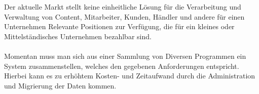 Der aktuelle Markt stellt keine einheitliche Lösung für die Verarbeitung und Verwaltung von Content, Mitarbeiter, Kunden, Händler und andere für einen Unternehmen Relevante Positionen zur Verfügung, die für ein kleines oder Mittelständisches Unternehmen bezahlbar sind.
\\
\\
Momentan muss man sich aus einer Sammlung von Diversen Programmen ein System zusammenstellen, welches den gegebenen Anforderungen entspricht.\\
Hierbei kann es zu erhöhtem Kosten- und Zeitaufwand durch die Administration und Migrierung der Daten kommen.
